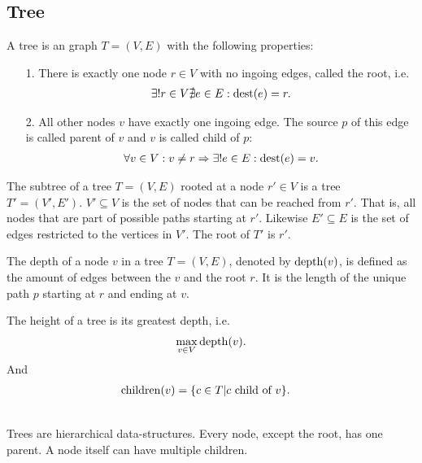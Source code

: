 \subsection{Tree}
	\begin{mydef}\label{tree}
		A \textnormal{tree} is an graph $T = (V, E)$ with the following properties:
		\begin{itemize}
			\item[1.] There is exactly one node $r \in V$ with no ingoing edges, called the \textnormal{root}, i.e.
				\begin{align*}
					\exists! r \in V \nexists e \in E : \operatorname{dest}(e) = r.
				\end{align*}
			\item[2.] All other nodes $v$ have exactly one ingoing edge. The source $p$ of this edge is called \textnormal{parent} of $v$ and
				$v$ is called \textnormal{child} of $p$:
				\begin{align*}
					\forall v \in V : v \neq r \Rightarrow \exists! e \in E : \operatorname{dest}(e) = v.
				\end{align*}
		\end{itemize}
	\end{mydef}
	\begin{mydef}\label{subTree}
		The \textnormal{subtree} of a tree $T = (V, E)$ rooted at a node $r' \in V$ is a tree $T' = (V', E')$. $V' \subseteq V$ is the set
		of nodes that can be reached from $r'$. That is, all nodes that are part of possible paths starting at $r'$.
		Likewise $E' \subseteq E$ is the set of edges restricted to the vertices in $V'$. The root of $T'$ is $r'$.
	\end{mydef}
	\begin{mydef}\label{treeDepth}
		The \textnormal{depth} of a node $v$ in a tree $T = (V, E)$, denoted by $\operatorname{depth}(v)$, is defined as the amount of
		edges between the $v$ and the root $r$. It is the length of the unique path $p$ starting at $r$ and ending at $v$.
		
		The \textnormal{height} of a tree is its greatest depth, i.e.
		\begin{align*}
			\max_{v \in V} \operatorname{depth}(v).
		\end{align*}
		And
		\begin{align*}
			\operatorname{children}(v)	&= \{c \in T | c \text{ child of } v\}.
		\end{align*}
	\end{mydef}\quad\\
	Trees are hierarchical data-structures. Every node, except the root, has one parent. A node itself can have multiple children.
